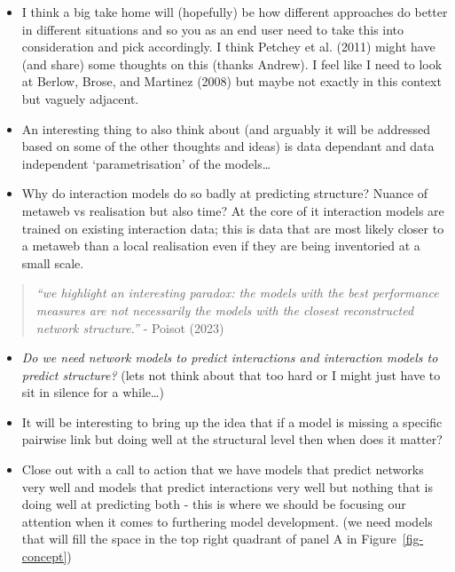 \documentclass[
  letterpaper,
  DIV=11,
  numbers=noendperiod]{scrartcl}
\begin{document}
\begin{itemize}
\item
  I think a big take home will (hopefully) be how different approaches
  do better in different situations and so you as an end user need to
  take this into consideration and pick accordingly. I think Petchey et
  al. (2011) might have (and share) some thoughts on this (thanks
  Andrew). I feel like I need to look at Berlow, Brose, and Martinez
  (2008) but maybe not exactly in this context but vaguely adjacent.
\item
  An interesting thing to also think about (and arguably it will be
  addressed based on some of the other thoughts and ideas) is data
  dependant and data independent `parametrisation' of the models\ldots{}
\item
  Why do interaction models do so badly at predicting structure? Nuance
  of metaweb vs realisation but also time? At the core of it interaction
  models are trained on existing interaction data; this is data that are
  most likely closer to a metaweb than a local realisation even if they
  are being inventoried at a small scale.
\end{itemize}

\begin{quote}
\emph{``we highlight an interesting paradox: the models with the best
performance measures are not necessarily the models with the closest
reconstructed network structure.''} - Poisot (2023)
\end{quote}

\begin{itemize}
\item
  \emph{Do we need network models to predict interactions and
  interaction models to predict structure?} (lets not think about that
  too hard or I might just have to sit in silence for a while\ldots)
\item
  It will be interesting to bring up the idea that if a model is missing
  a specific pairwise link but doing well at the structural level then
  when does it matter?
\item
  Close out with a call to action that we have models that predict
  networks very well and models that predict interactions very well but
  nothing that is doing well at predicting both - this is where we
  should be focusing our attention when it comes to furthering model
  development. (we need models that will fill the space in the top right
  quadrant of panel A in Figure~\ref{fig-concept})
\end{itemize}
\end{document}
